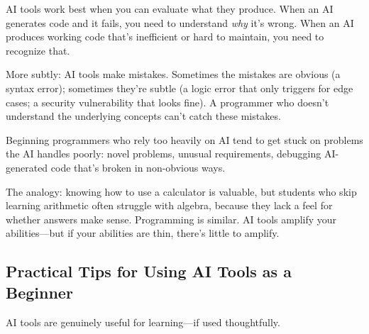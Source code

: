 \documentclass[11pt,letterpaper]{article}
\begin{document}
\begin{debatebox}
AI tools work best when you can evaluate what they produce. When an AI generates code and it fails, you need to understand \textit{why} it's wrong. When an AI produces working code that's inefficient or hard to maintain, you need to recognize that.

More subtly: AI tools make mistakes. Sometimes the mistakes are obvious (a syntax error); sometimes they're subtle (a logic error that only triggers for edge cases; a security vulnerability that looks fine). A programmer who doesn't understand the underlying concepts can't catch these mistakes.

Beginning programmers who rely too heavily on AI tend to get stuck on problems the AI handles poorly: novel problems, unusual requirements, debugging AI-generated code that's broken in non-obvious ways.
\end{debatebox}

The analogy: knowing how to use a calculator is valuable, but students who skip learning arithmetic often struggle with algebra, because they lack a feel for whether answers make sense. Programming is similar. AI tools amplify your abilities---but if your abilities are thin, there's little to amplify.

\subsection{Practical Tips for Using AI Tools as a Beginner}

AI tools are genuinely useful for learning---if used thoughtfully.
\end{document}
